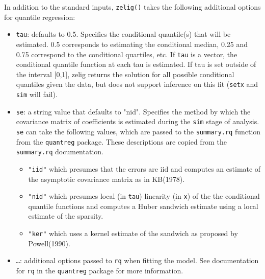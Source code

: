 In addition to the standard inputs, {\tt zelig()} takes the following
additional options for quantile regression:  
\begin{itemize}
\item {\tt tau}: defaults to 0.5. Specifies the conditional quantile(s)
that will be estimated. 0.5 corresponds to estimating the conditional
median, 0.25 and 0.75 correspond to the conditional quartiles, etc. If
{\tt tau} is a vector, the conditional quantile function at each tau is
estimated. If tau is set outside of the interval [0,1], zelig returns
the solution for all possible conditional quantiles given the data, but
does not support inference on this fit ({\tt setx} and {\tt sim} will fail).

\item {\tt se}: a string value that defaults to "nid". Specifies the
method by which the covariance matrix of coefficients is estimated during
the {\tt sim} stage of analysis. {\tt se}
can take the following values, which are passed to the {\tt summary.rq}
function from the {\tt quantreg} package. These descriptions are copied from
the {\tt summary.rq} documentation.  
\begin{itemize}
    \item {\tt "iid"} which presumes that the errors are iid and computes
    an estimate of the asymptotic covariance matrix as in KB(1978).
      
    \item {\tt "nid"} which presumes local (in {\tt tau})
    linearity (in {\tt x}) of the
    the conditional quantile functions and computes a Huber
    sandwich estimate using a local estimate of the sparsity.
      
    \item {\tt "ker"} which uses a kernel estimate of the sandwich
    as proposed by Powell(1990).
\end{itemize} 
\item {\tt \dots}:  additional options passed to {\tt rq} when fitting the model.   
See documentation for {\tt rq} in the {\tt quantreg} package for more information.
\end{itemize}

